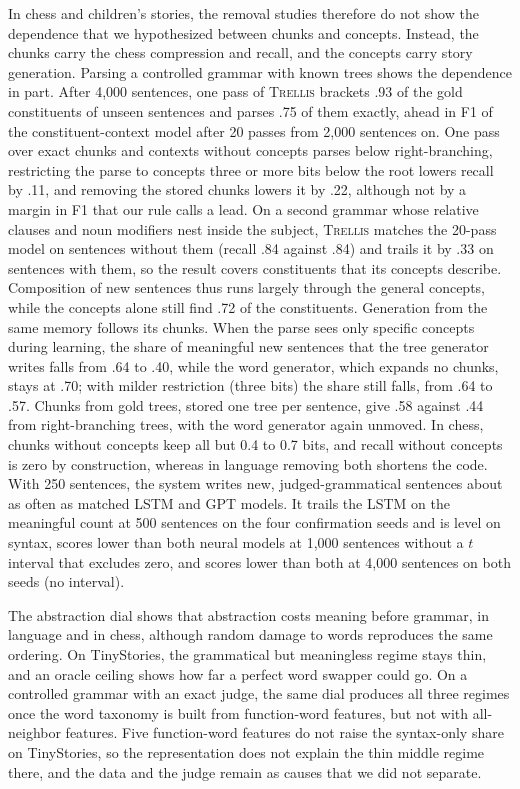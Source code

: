 \documentclass[11pt,letterpaper]{article}
\newcommand{\trellis}{\textsc{Trellis}}
\begin{document}
In chess and children's stories, the removal studies therefore do not show the
dependence that we hypothesized between chunks and concepts. Instead, the chunks carry
the chess compression and recall, and the concepts carry story generation. Parsing a
controlled grammar with known trees shows the dependence in part. After 4,000 sentences,
one pass of \trellis{} brackets .93 of the gold constituents of unseen sentences and
parses .75 of them exactly, ahead in F1 of the constituent-context model after 20 passes
from 2,000 sentences on. One pass over exact chunks and contexts without concepts parses
below right-branching, restricting the parse to concepts three or more bits below the root
lowers recall by .11, and removing the stored chunks lowers it by .22, although not by a
margin in F1 that our rule calls a lead. On a second grammar whose relative clauses and
noun modifiers nest inside the subject, \trellis{} matches the 20-pass model on sentences
without them (recall .84 against .84) and trails it by .33 on sentences with them, so the
result covers constituents that its concepts describe. Composition of new sentences thus runs largely
through the general concepts, while the concepts alone still find .72 of the
constituents. Generation from the same memory follows its chunks. When the parse
sees only specific concepts during learning, the share of meaningful new sentences that
the tree generator writes falls from .64 to .40, while the word generator, which expands
no chunks, stays at .70; with milder restriction (three bits) the share still falls,
from .64 to .57. Chunks from gold trees, stored one tree per sentence, give .58 against .44
from right-branching trees, with the word generator again unmoved. In chess, chunks without concepts keep all but 0.4
to 0.7 bits, and recall without concepts is zero by construction, whereas in language
removing both shortens the code. With 250 sentences, the system writes new,
judged-grammatical sentences about as often as matched LSTM and GPT models. It trails
the LSTM on the meaningful count at 500 sentences on the four confirmation seeds and is
level on syntax, scores lower than both neural models at 1,000 sentences without a $t$
interval that excludes zero, and scores lower than both at 4,000 sentences on both seeds
(no interval).

The abstraction dial shows that abstraction costs meaning before grammar, in language
and in chess, although random damage to words reproduces the same ordering. On
TinyStories, the grammatical but meaningless regime stays thin, and an oracle ceiling
shows how far a perfect word swapper could go. On a controlled grammar with an exact
judge, the same dial produces all three regimes once the word taxonomy is built from
function-word features, but not with all-neighbor features. Five function-word features
do not raise the syntax-only share on TinyStories, so the representation does not
explain the thin middle regime there, and the data and the judge remain as causes that
we did not separate.
\end{document}
